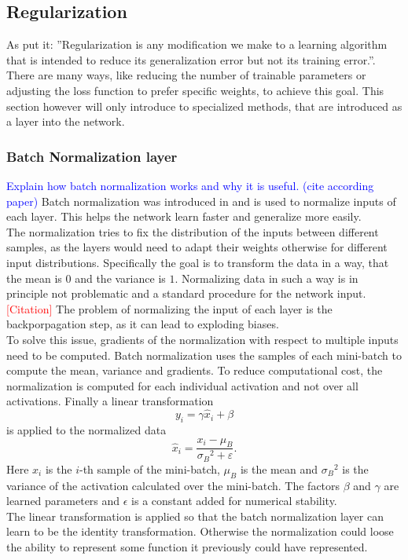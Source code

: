 \subsection{Regularization}\label{sec:regularization}
As \cite{deep_learning_book} put it: ''Regularization is any modification we make to a learning algorithm that is intended to reduce its generalization error but not its training error.''. There are many ways, like reducing the number of trainable parameters or adjusting the loss function to prefer specific weights, to achieve this goal. This section however will only introduce to specialized methods, that are introduced as a layer into the network.

\subsubsection{Batch Normalization layer}\label{sec:batch_norm}
\textcolor{blue}{Explain how batch normalization works and why it is useful. (cite according paper)}
Batch normalization was introduced in \cite{batch_normalization_invention} and is used to normalize inputs of each layer. This helps the network learn faster and generalize more easily.\\
The normalization tries to fix the distribution of the inputs between different samples, as the layers would need to adapt their weights otherwise for different input distributions. Specifically the goal is to transform the data in a way, that the mean is $0$ and the variance is $1$. Normalizing data in such a way is in principle not problematic and a standard procedure for the network input. \textcolor{red}{[Citation]} The problem of normalizing the input of each layer is the backporpagation step, as it can lead to exploding biases. \cite{batch_normalization_invention}\\
To solve this issue, gradients of the normalization with respect to multiple inputs need to be computed. Batch normalization uses the samples of each mini-batch to compute the mean, variance and gradients. To reduce computational cost, the normalization is computed for each individual activation and not over all activations. Finally a linear transformation
\begin{equation}
y_i = \gamma \hat{x}_i + \beta
\end{equation}
is applied to the normalized data
\begin{equation}
\hat{x}_i = \frac{x_i - \mu_B}{{\sigma_B}^2 + \varepsilon}.
\end{equation}
Here $x_i$ is the $i$-th sample of the mini-batch, $\mu_B$ is the mean and ${\sigma_B}^2$ is the variance of the activation calculated over the mini-batch. The factors $\beta$ and $\gamma$ are learned parameters and $\epsilon$ is a constant added for numerical stability.\\
The linear transformation is applied so that the batch normalization layer can learn to be the identity transformation. Otherwise the normalization could loose the ability to represent some function it previously could have represented.


